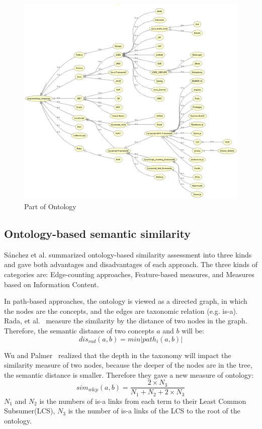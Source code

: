 \begin{figure}[htbp]
  \includegraphics[scale=0.6]{images/ontology_pro.png}
  \caption{Part of Ontology}
  \label{fig:ontology_pro}
\end{figure}

\subsection{Ontology-based semantic similarity}

S{\'a}nchez et al. \cite{sanchez2012ontology} summarized ontology-based similarity assessment into three kinds and gave both advantages and disadvantages of each approach. The three kinds of categories are: Edge-counting approaches, Feature-based measures, and Measures based on Information Content.



In path-based approaches, the ontology is viewed as a directed graph, in which the nodes are the concepts, and the edges are taxonomic relation (e.g. is-a). Rada, et al.~\cite{rada1989development} measure the similarity by the distance of two nodes in the graph. Therefore, the semantic distance of two concepts $a$ and $b$ will be:
$$ dis_{rad}(a,b) = min |path_i(a,b)| $$

Wu and Palmer~\cite{wu1994verbs} realized that the depth in the taxonomy will impact the similarity measure of two nodes, because the deeper of the nodes are in the tree, the semantic distance is smaller. Therefore they gave a new measure of ontology:
$$ sim_{w\&p}(a,b) = \frac{2 \times N_3}{N_1 + N_2 + 2 \times N_3} $$
$N_1$ and $N_2$ is the numbers of is-a links from each term to their Least Common Subsumer(LCS), $N_3$ is the number of is-a links of the LCS to the root of the ontology.

